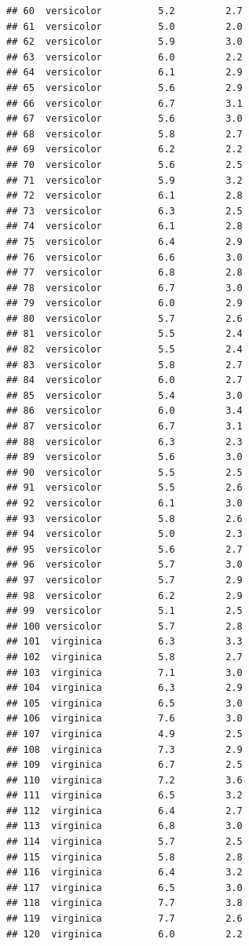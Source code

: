 \documentclass[]{book}
\begin{document}
\begin{verbatim}
## 60  versicolor          5.2         2.7
## 61  versicolor          5.0         2.0
## 62  versicolor          5.9         3.0
## 63  versicolor          6.0         2.2
## 64  versicolor          6.1         2.9
## 65  versicolor          5.6         2.9
## 66  versicolor          6.7         3.1
## 67  versicolor          5.6         3.0
## 68  versicolor          5.8         2.7
## 69  versicolor          6.2         2.2
## 70  versicolor          5.6         2.5
## 71  versicolor          5.9         3.2
## 72  versicolor          6.1         2.8
## 73  versicolor          6.3         2.5
## 74  versicolor          6.1         2.8
## 75  versicolor          6.4         2.9
## 76  versicolor          6.6         3.0
## 77  versicolor          6.8         2.8
## 78  versicolor          6.7         3.0
## 79  versicolor          6.0         2.9
## 80  versicolor          5.7         2.6
## 81  versicolor          5.5         2.4
## 82  versicolor          5.5         2.4
## 83  versicolor          5.8         2.7
## 84  versicolor          6.0         2.7
## 85  versicolor          5.4         3.0
## 86  versicolor          6.0         3.4
## 87  versicolor          6.7         3.1
## 88  versicolor          6.3         2.3
## 89  versicolor          5.6         3.0
## 90  versicolor          5.5         2.5
## 91  versicolor          5.5         2.6
## 92  versicolor          6.1         3.0
## 93  versicolor          5.8         2.6
## 94  versicolor          5.0         2.3
## 95  versicolor          5.6         2.7
## 96  versicolor          5.7         3.0
## 97  versicolor          5.7         2.9
## 98  versicolor          6.2         2.9
## 99  versicolor          5.1         2.5
## 100 versicolor          5.7         2.8
## 101  virginica          6.3         3.3
## 102  virginica          5.8         2.7
## 103  virginica          7.1         3.0
## 104  virginica          6.3         2.9
## 105  virginica          6.5         3.0
## 106  virginica          7.6         3.0
## 107  virginica          4.9         2.5
## 108  virginica          7.3         2.9
## 109  virginica          6.7         2.5
## 110  virginica          7.2         3.6
## 111  virginica          6.5         3.2
## 112  virginica          6.4         2.7
## 113  virginica          6.8         3.0
## 114  virginica          5.7         2.5
## 115  virginica          5.8         2.8
## 116  virginica          6.4         3.2
## 117  virginica          6.5         3.0
## 118  virginica          7.7         3.8
## 119  virginica          7.7         2.6
## 120  virginica          6.0         2.2

\end{verbatim}
\end{document}
